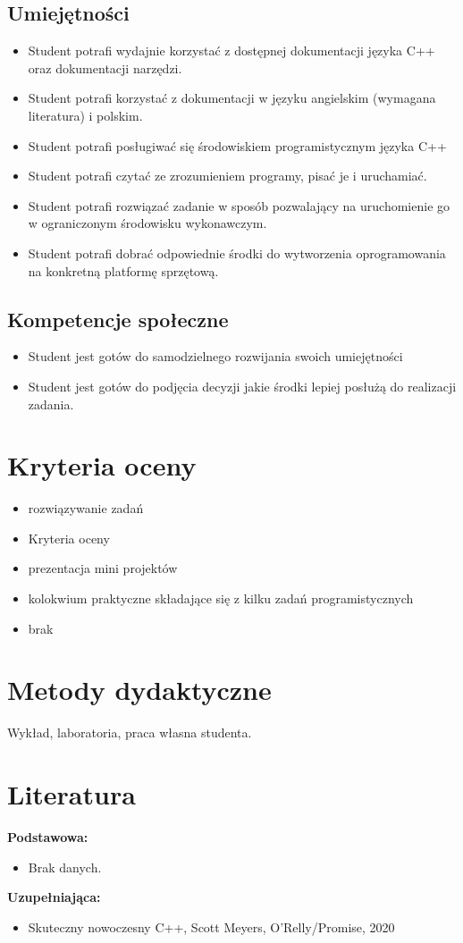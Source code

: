 \documentclass[12pt, a4paper]{article}
\begin{document}
\subsection*{Umiejętności}
\begin{itemize}
  \item Student potrafi wydajnie korzystać z dostępnej dokumentacji języka C++ oraz dokumentacji narzędzi.
  \item Student potrafi korzystać z dokumentacji w języku angielskim (wymagana literatura) i polskim.
  \item Student potrafi posługiwać się środowiskiem programistycznym języka C++
  \item Student potrafi czytać ze zrozumieniem programy, pisać je i uruchamiać.
  \item Student potrafi rozwiązać zadanie w sposób pozwalający na uruchomienie go w ograniczonym środowisku wykonawczym.
  \item Student potrafi dobrać odpowiednie środki do wytworzenia oprogramowania na konkretną platformę sprzętową.
\end{itemize}

\subsection*{Kompetencje społeczne}
\begin{itemize}
  \item Student jest gotów do samodzielnego rozwijania swoich umiejętności
  \item Student jest gotów do podjęcia decyzji jakie środki lepiej posłużą do realizacji zadania.
\end{itemize}

\section{Kryteria oceny}

\begin{itemize}
  \item rozwiązywanie zadań
  \item Kryteria oceny
  \item prezentacja mini projektów
  \item kolokwium praktyczne składające się z kilku zadań programistycznych
  \item brak
\end{itemize}

\section{Metody dydaktyczne}

Wykład, laboratoria, praca własna studenta.

\section{Literatura}

\textbf{Podstawowa:}
\begin{itemize}
  \item Brak danych.
\end{itemize}

\textbf{Uzupełniająca:}
\begin{itemize}
  \item Skuteczny nowoczesny C++, Scott Meyers, O'Relly/Promise, 2020
\end{itemize}
\end{document}
